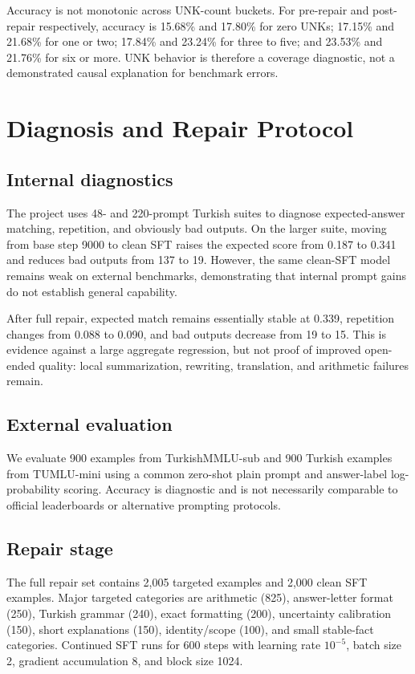 \documentclass[11pt]{article}
\newcommand{\tmmlu}{TurkishMMLU-sub}
\begin{document}
Accuracy is not monotonic across UNK-count buckets. For pre-repair and
post-repair respectively, accuracy is 15.68\% and 17.80\% for zero UNKs;
17.15\% and 21.68\% for one or two; 17.84\% and 23.24\% for three to five;
and 23.53\% and 21.76\% for six or more. UNK behavior is therefore a coverage
diagnostic, not a demonstrated causal explanation for benchmark errors.

\section{Diagnosis and Repair Protocol}

\subsection{Internal diagnostics}

The project uses 48- and 220-prompt Turkish suites to diagnose expected-answer
matching, repetition, and obviously bad outputs. On the larger suite, moving
from base step 9000 to clean SFT raises the expected score from 0.187 to 0.341
and reduces bad outputs from 137 to 19. However, the same clean-SFT model
remains weak on external benchmarks, demonstrating that internal prompt gains
do not establish general capability.

After full repair, expected match remains essentially stable at 0.339,
repetition changes from 0.088 to 0.090, and bad outputs decrease from 19 to 15.
This is evidence against a large aggregate regression, but not proof of
improved open-ended quality: local summarization, rewriting, translation, and
arithmetic failures remain.

\subsection{External evaluation}

We evaluate 900 examples from \tmmlu{} and 900 Turkish examples from TUMLU-mini
using a common zero-shot plain prompt and answer-label log-probability scoring.
Accuracy is diagnostic and is not necessarily comparable to official
leaderboards or alternative prompting protocols.

\subsection{Repair stage}

The full repair set contains 2,005 targeted examples and 2,000 clean SFT
examples. Major targeted categories are arithmetic (825), answer-letter format
(250), Turkish grammar (240), exact formatting (200), uncertainty calibration
(150), short explanations (150), identity/scope (100), and small stable-fact
categories. Continued SFT runs for 600 steps with learning rate $10^{-5}$,
batch size 2, gradient accumulation 8, and block size 1024.
\end{document}
